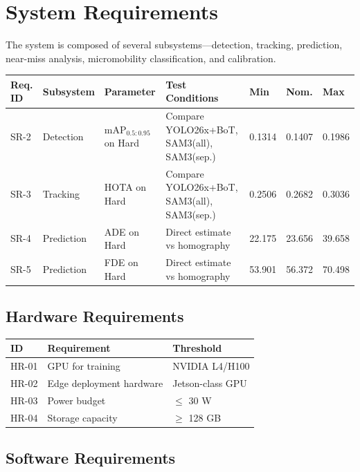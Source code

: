 \documentclass[12pt,letterpaper]{article}
\begin{document}
\section{System Requirements}

The system is composed of several subsystems---detection, tracking, prediction, near-miss analysis, micromobility classification, and calibration.

\begin{longtable}{|p{1.2cm}|p{2cm}|p{3cm}|p{3.5cm}|p{1.2cm}|p{1.2cm}|p{1.2cm}|}
\hline
\textbf{Req. ID} & \textbf{Subsystem} & \textbf{Parameter} & \textbf{Test Conditions} & \textbf{Min} & \textbf{Nom.} & \textbf{Max} \\
\hline
\endhead
SR-2 & Detection & mAP$_{0.5:0.95}$ on Hard & Compare YOLO26x+BoT, SAM3(all), SAM3(sep.) & 0.1314 & 0.1407 & 0.1986 \\
\hline
SR-3 & Tracking & HOTA on Hard & Compare YOLO26x+BoT, SAM3(all), SAM3(sep.) & 0.2506 & 0.2682 & 0.3036 \\
\hline
SR-4 & Prediction & ADE on Hard & Direct estimate vs homography & 22.175 & 23.656 & 39.658 \\
\hline
SR-5 & Prediction & FDE on Hard & Direct estimate vs homography & 53.901 & 56.372 & 70.498 \\
\hline
\end{longtable}

\subsection{Hardware Requirements}

\begin{tabular}{|p{1.5cm}|p{5cm}|p{5cm}|}
\hline
\textbf{ID} & \textbf{Requirement} & \textbf{Threshold} \\
\hline
HR-01 & GPU for training & NVIDIA L4/H100 \\
\hline
HR-02 & Edge deployment hardware & Jetson-class GPU \\
\hline
HR-03 & Power budget & $\leq$ 30 W \\
\hline
HR-04 & Storage capacity & $\geq$ 128 GB \\
\hline
\end{tabular}

\subsection{Software Requirements}
\end{document}
